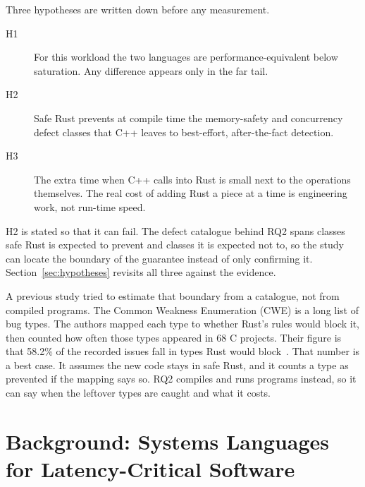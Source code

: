 \documentclass[english,oneside,a4paper,censored,csm,software-track-2020]{HYthesisML}
\begin{document}
Three hypotheses are written down before any measurement.

\begin{description}
\item[H1] For this workload the two languages are performance-equivalent below saturation. Any
  difference appears only in the far tail.
\item[H2] Safe Rust prevents at compile time the memory-safety and concurrency defect classes
  that C++ leaves to best-effort, after-the-fact detection.
\item[H3] The extra time when C++ calls into Rust is small next to the operations themselves.
  The real cost of adding Rust a piece at a time is engineering work, not run-time speed.
\end{description}

H2 is stated so that it can fail. The defect catalogue behind RQ2 spans classes safe Rust is
expected to prevent and classes it is expected not to, so the study can locate the boundary of
the guarantee instead of only confirming it. Section~\ref{sec:hypotheses} revisits all three
against the evidence.

A previous study tried to estimate that boundary from a catalogue, not from compiled
programs. The Common Weakness Enumeration (CWE) is a long list of bug types. The authors mapped
each type to whether Rust's rules would block it, then counted how often those types appeared
in 68 C projects. Their figure is that 58.2\% of the recorded issues fall in types Rust would
block~\cite{meneely2025justuserust}. That number is a best case. It assumes the new code stays
in safe Rust, and it counts a type as prevented if the mapping says so. RQ2 compiles and runs
programs instead, so it can say when the leftover types are caught and what it costs.

\chapter{Background: Systems Languages for Latency-Critical Software\label{chapter:background}}
\end{document}
